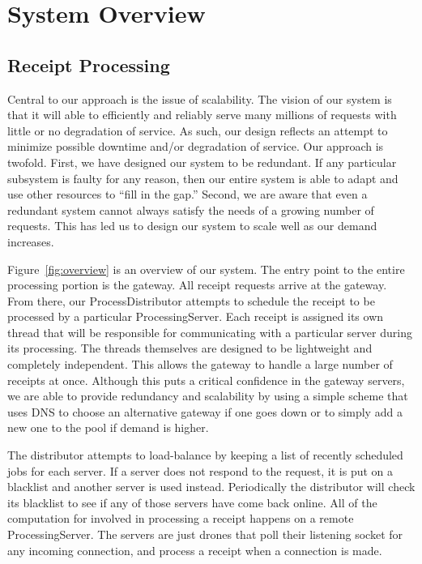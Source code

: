 \section{System Overview}

\subsection{Receipt Processing}

Central to our approach is the issue of scalability. The vision of our
system is that it will able to efficiently and reliably serve many
millions of requests with little or no degradation of service. As
such, our design reflects an attempt to minimize possible downtime
and/or degradation of service. Our approach is twofold. First, we have
designed our system to be redundant. If any particular subsystem is
faulty for any reason, then our entire system is able to adapt and use
other resources to ``fill in the gap.'' Second, we are aware that even
a redundant system cannot always satisfy the needs of a growing number
of requests. This has led us to design our system to scale well as our
demand increases. 

Figure~\ref{fig:overview} is an overview of our system. The entry
point to the entire processing portion is the gateway. All receipt
requests arrive at the gateway. From there, our ProcessDistributor
attempts to schedule the receipt to be processed by a particular
ProcessingServer. Each receipt is assigned its own thread that will be
responsible for communicating with a particular server during its
processing. The threads themselves are designed to be lightweight and
completely independent. This allows the gateway to handle a large
number of receipts at once. Although this puts a critical confidence
in the gateway servers, we are able to provide redundancy and
scalability by using a simple scheme that uses DNS to choose an
alternative gateway if one goes down or to simply add a new one to the
pool if demand is higher.

The distributor attempts to load-balance by keeping a list of recently
scheduled jobs for each server. If a server does not respond to the
request, it is put on a blacklist and another server is used
instead. Periodically the distributor will check its blacklist to see
if any of those servers have come back online. All of the computation
for involved in processing a receipt happens on a remote
ProcessingServer. The servers are just drones that poll their
listening socket for any incoming connection, and process a receipt
when a connection is made.

